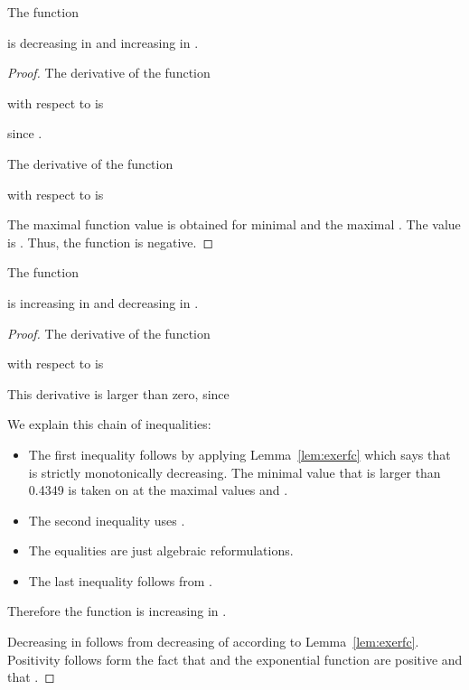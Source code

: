 \documentclass{article}
\begin{document}
\begin{lemma}[Function ]
\label{lem:F6}

The function
 
is decreasing in  and increasing in .
\end{lemma}
\begin{proof}
The derivative of the function

with respect to  is

since 
.

The derivative of the function

with respect to  is


The maximal function value is obtained for 
minimal  and the maximal  . 
The value is
.
Thus, the function is negative.
\end{proof}

\begin{lemma}[Function ]
\label{lem:F7}

The function 
  
is increasing in  and decreasing in .
\end{lemma}


\begin{proof}

The derivative of the function

with respect to  is


This derivative is larger than zero, since


We explain this chain of inequalities:
\begin{itemize}
\item The first inequality follows by applying Lemma~\ref{lem:exerfc}
  which says that  
is strictly monotonically decreasing. The minimal value that is larger
than 0.4349 is taken on at
the maximal values  and . 
\item The second inequality uses 
.
\item The equalities are just algebraic reformulations.
\item The last inequality follows from
.
\end{itemize}
Therefore the function is increasing in  .

Decreasing in  follows from decreasing of 
according to Lemma~\ref{lem:exerfc}.
Positivity follows form the fact that  and the
exponential function are positive and that  . 
\end{proof}
\end{document}
